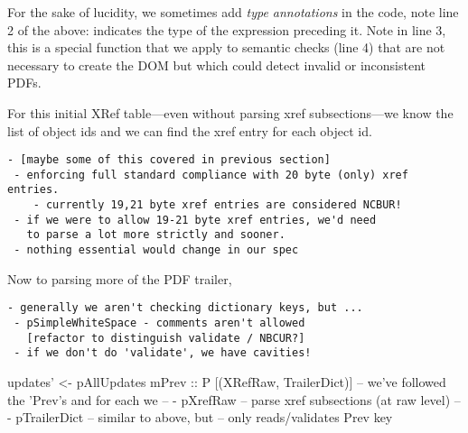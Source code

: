 For the sake of lucidity, we sometimes add \emph{type annotations} in the code,
note line 2 of the above:  indicates the type of
the expression preceding it.
%
Note  in line 3, this is a special function that we apply to
semantic checks (line 4) that are not necessary to create the DOM but which
could detect invalid or inconsistent PDFs.

For this initial XRef table---even without parsing xref subsections---we
know the list of object ids and we can find the xref entry for each object id.

\begin{lstlisting}[style=meta]
 - [maybe some of this covered in previous section]
 - enforcing full standard compliance with 20 byte (only) xref entries.
    - currently 19,21 byte xref entries are considered NCBUR!
 - if we were to allow 19-21 byte xref entries, we'd need
   to parse a lot more strictly and sooner.
 - nothing essential would change in our spec
\end{lstlisting}
Now to parsing more of the PDF trailer,

\begin{lstlisting}[style=meta]
 - generally we aren't checking dictionary keys, but ...
 - pSimpleWhiteSpace - comments aren't allowed
   [refactor to distinguish validate / NBCUR?]
 - if we don't do 'validate', we have cavities!
\end{lstlisting}
\begin{code}
    updates' <- pAllUpdates mPrev :: P [(XRefRaw, TrailerDict)]
       -- we've followed the 'Prev's and for each we
       --   - pXrefRaw     -- parse xref subsections (at raw level)
       --   - pTrailerDict -- similar to above, but
       --                     only reads/validates Prev key
\end{code}


